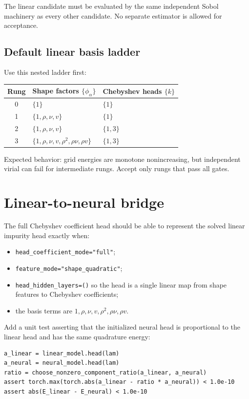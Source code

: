 \documentclass[11pt]{article}
\begin{document}
The linear candidate must be evaluated by the same independent Sobol machinery as every other candidate. No separate estimator is allowed for acceptance.

\subsection{Default linear basis ladder}

Use this nested ladder first:

\begin{center}
\begin{tabular}{cll}
\toprule
Rung & Shape factors \(\{\phi_\alpha\}\) & Chebyshev heads \(\{k\}\) \\
\midrule
0 & \(\{1\}\) & \(\{1\}\) \\
1 & \(\{1,\rho,\nu,v\}\) & \(\{1\}\) \\
2 & \(\{1,\rho,\nu,v\}\) & \(\{1,3\}\) \\
3 & \(\{1,\rho,\nu,v,\rho^2,\rho\nu,\rho v\}\) & \(\{1,3\}\) \\
\bottomrule
\end{tabular}
\end{center}

Expected behavior: grid energies are monotone nonincreasing, but independent virial can fail for intermediate rungs. Accept only rungs that pass all gates.

\section{Linear-to-neural bridge}

The full Chebyshev coefficient head should be able to represent the solved linear impurity head exactly when:
\begin{itemize}
\item \texttt{head\_coefficient\_mode="full"};
\item \texttt{feature\_mode="shape\_quadratic"};
\item \texttt{head\_hidden\_layers=()} so the head is a single linear map from shape features to Chebyshev coefficients;
\item the basis terms are \(1,\rho,\nu,v,\rho^2,\rho\nu,\rho v\).
\end{itemize}

Add a unit test asserting that the initialized neural head is proportional to the linear head and has the same quadrature energy:

\begin{lstlisting}[style=pythonstyle]
a_linear = linear_model.head(lam)
a_neural = neural_model.head(lam)
ratio = choose_nonzero_component_ratio(a_linear, a_neural)
assert torch.max(torch.abs(a_linear - ratio * a_neural)) < 1.0e-10
assert abs(E_linear - E_neural) < 1.0e-10
\end{lstlisting}
\end{document}
